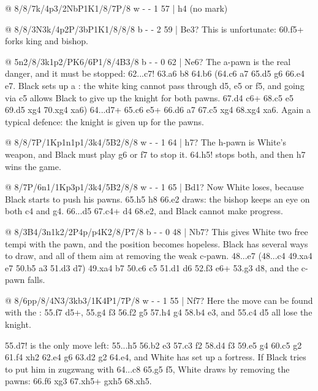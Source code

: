 @ 8/8/7k/4p3/2NbP1K1/8/7P/8 w - - 1 57 | h4 (no mark)

@ 8/8/3N3k/4p2P/3bP1K1/8/8/8 b - - 2 59 | Be3?
This is unfortunate: 60.\N f5+ forks king and bishop.

@ 5n2/8/3k1p2/PK6/6P1/8/4B3/8 b - - 0 62 | Ne6?
The a-pawn is the real danger, and it must be stopped: 62...\K c7! 63.a6 \K b8 64.\K b6 (64.\K c6
\K a7 65.\K d5 \N g6 66.\K e4 \N e7. Black sets up a :
the white king cannot pass through d5, e5 or f5, and going via c5 allows Black to give up the knight
for both pawns. 67.\K d4 \N c6+ 68.\K c5 \N e5 69.\K d5 \N xg4 70.\B xg4 \K xa6) 64...\N d7+
65.\K c6 \N e5+ 66.\K d6 \K a7 67.\K c5 \N xg4 68.\B xg4 \K xa6. Again a typical defence: the
knight is given up for the pawns.

@ 8/8/7P/1Kp1n1p1/3k4/5B2/8/8 w - - 1 64 | h7?
 The h-pawn is White's weapon, and Black must play
\N g6 or \N f7 to stop it. 64.\B h5! stops both, and then h7 wins the game.

@ 8/7P/6n1/1Kp3p1/3k4/5B2/8/8 w - - 1 65 | Bd1?
Now White loses, because Black starts to push his pawns. 65.\B h5 \N h8 66.\B e2 draws: the bishop
keeps an eye on both c4 and g4. 66...\K d5 67.\B c4+ \K d4 68.\B e2, and Black cannot make progress.

@ 8/3B4/3n1k2/2P4p/p4K2/8/P7/8 b - - 0 48 | Nb7?
This gives White two free tempi with the pawn, and the position becomes hopeless. Black has
several ways to draw, and all of them aim at removing the weak c-pawn.
48...\K e7 (48...\N c4 49.\B xa4 \K e7 50.\B b5 \N a3 51.\B d3 \K d7) 49.\B xa4 \N b7 50.c6 \N c5
51.\B d1 \K d6 52.\B f3 \N e6+ 53.\K g3 \N d8, and the c-pawn falls.

@ 8/6pp/8/4N3/3kb3/1K4P1/7P/8 w - - 1 55 | Nf7?
Here the move can be found with the :
55.\N f7 \B d5+, 55.\N g4 \B f3 56.\N f2 g5 57.h4 g4 58.\K b4 \K e3, and 55.\N c4 \B d5 all lose
the knight.

55.\N d7! is the only move left: 55...h5 56.\K b2 \K e3 57.\K c3 \K f2 58.\K d4 \B f3 59.\K e5 \B g4
60.\N c5 \K g2 61.\K f4 \K xh2 62.\N e4 g6 63.\N d2 \K g2 64.\N e4, and White has set up a
fortress. If Black tries to put him in zugzwang with 64...\B c8 65.\K g5 \B f5,
White draws by removing the pawns: 66.\N f6 \K xg3 67.\N xh5+ gxh5
68.\K xh5.

